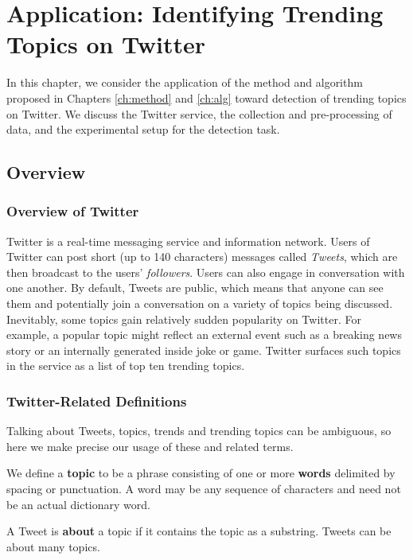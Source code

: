 \chapter{Application: Identifying Trending Topics on Twitter}
\label{ch:data}


In this chapter, we consider the application of the method and algorithm proposed
in Chapters \ref{ch:method} and \ref{ch:alg} toward detection of trending topics
on Twitter. We discuss the Twitter service, the collection and pre-processing of
data, and the experimental setup for the detection task.

\section{Overview}
\subsection{Overview of Twitter}
Twitter is a real-time messaging service and information network. Users of
Twitter can post short (up to 140 characters) messages called {\em Tweets},
which are then broadcast to the users' {\em followers}. Users can also engage in
conversation with one another. By default, Tweets are public, which means that
anyone can see them and potentially join a conversation on a variety of topics
being discussed. Inevitably, some topics gain relatively sudden popularity on
Twitter. For example, a popular topic might reflect an external event such as a
breaking news story or an internally generated inside joke or game. Twitter
surfaces such topics in the service as a list of top ten trending topics. 

\subsection{Twitter-Related Definitions}
Talking about Tweets, topics, trends and trending topics can be ambiguous, so
here we make precise our usage of these and related terms.

\begin{defn}[Topic]
  We define a {\bf topic} to be a phrase consisting of one or more {\bf words}
  delimited by spacing or punctuation. A word may be any sequence of characters
  and need not be an actual dictionary word.
\end{defn}

\begin{defn}
A Tweet is {\bf about} a topic if it contains the topic as a substring. Tweets
can be about many topics.
\end{defn}

